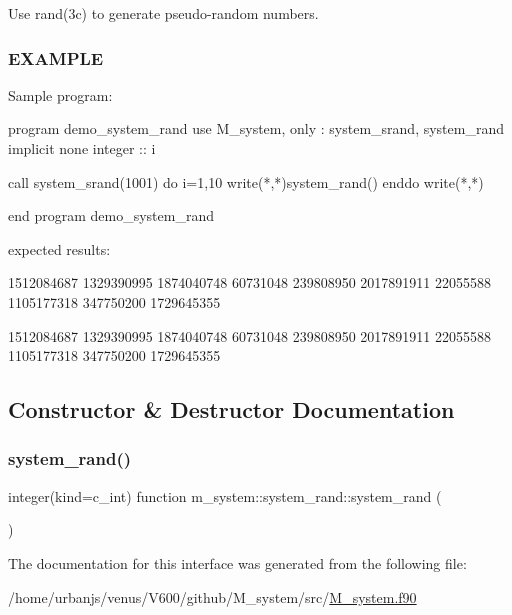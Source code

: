 Use rand(3c) to generate pseudo-\/random numbers.

\subsubsection*{E\+X\+A\+M\+P\+LE}

\begin{DoxyVerb}Sample program:

   program demo_system_rand
   use M_system, only : system_srand, system_rand
   implicit none
   integer :: i

   call system_srand(1001)
   do i=1,10
      write(*,*)system_rand()
   enddo
   write(*,*)

   end program demo_system_rand
\end{DoxyVerb}
 expected results\+:

1512084687 1329390995 1874040748 60731048 239808950 2017891911 22055588 1105177318 347750200 1729645355

1512084687 1329390995 1874040748 60731048 239808950 2017891911 22055588 1105177318 347750200 1729645355 

\subsection{Constructor \& Destructor Documentation}
\mbox{\label{interfacem__system_1_1system__rand_a35d3d17489a09dede93091bdc4ab69e0}} 
\subsubsection{\texorpdfstring{system\+\_\+rand()}{system\_rand()}}
{\footnotesize\ttfamily integer(kind=c\+\_\+int) function m\+\_\+system\+::system\+\_\+rand\+::system\+\_\+rand (\begin{DoxyParamCaption}{ }\end{DoxyParamCaption})\hspace{0.3cm}{\ttfamily [private]}}



The documentation for this interface was generated from the following file\+:\begin{DoxyCompactItemize}
\item 
/home/urbanjs/venus/\+V600/github/\+M\+\_\+system/src/\mbox{\hyperlink{M__system_8f90}{M\+\_\+system.\+f90}}\end{DoxyCompactItemize}
